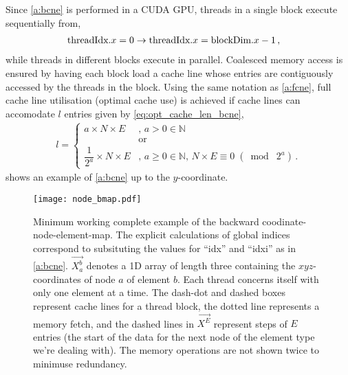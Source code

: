 Since \cref{a:bcne} is performed in a CUDA GPU, threads in a single block execute sequentially from,
\begin{align}
	\textrm{threadIdx}.x & = 0 \to \textrm{threadIdx}.x = \textrm{blockDim}.x - 1\,,
\end{align}
while threads in different blocks execute in parallel. Coalesced memory access is ensured by having each block load a cache line whose entries are contiguously accessed by the threads in the block. Using the same notation as \cref{a:fcne}, full cache line utilisation (optimal cache use) is achieved if cache lines can accomodate $ l $ entries given by \cref{eq:opt_cache_len_bcne},
\begin{align}
	\label{eq:opt_cache_len_bcne}
	l =
	\begin{cases}
		a \times N \times E                & ,\, a > 0 \in \mathbb{N}                                                \\
		                                   & \textrm{or}                                                             \\
		\dfrac{1}{2^{a}} \times N \times E & ,\, a \geq 0 \in \mathbb{N},\, N \times E \equiv 0\; (\bmod\; 2^{a})\,.
	\end{cases}
\end{align}
 shows an example of \cref{a:bcne} up to the $ y $-coordinate.
\begin{figure}
	\centering
	\texttt{[image: node\_bmap.pdf]}
	\caption[Example of the backward coodinate-node-element-map.]{Minimum working complete example of the backward coodinate-node-element-map. The explicit calculations of global indices correspond to subsituting the values for ``idx'' and ``idxi'' as in \cref{a:bcne}. $\vec{X_{a}^{b}}$ denotes a 1D array of length three containing the $ xyz $-coordinates of node $ a $ of element $ b $. Each thread concerns itself with only one element at a time. The dash-dot and dashed boxes represent cache lines for a thread block, the dotted line represents a memory fetch, and the dashed lines in $ \vec{X^{E}} $ represent steps of $ E $ entries (the start of the data for the next node of the element type we're dealing with). The memory operations are not shown twice to minimuse redundancy.}
	\label{f:fcne_eg}
\end{figure}

